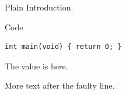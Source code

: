 \documentclass{beamer}
\begin{document}
\begin{frame}{Plain}
Introduction.
\end{frame}
\begin{frame}[fragile]{Code}
\begin{verbatim}
int main(void) { return 0; }
\end{verbatim}
The value is \undefinedmacro{} here.

More text after the faulty line.
\end{frame}
\end{document}
